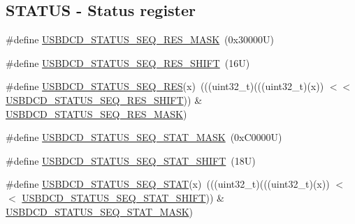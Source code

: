 \subsection*{S\+T\+A\+T\+US -\/ Status register}
\begin{DoxyCompactItemize}
\item 
\#define \mbox{\hyperlink{group___u_s_b_d_c_d___register___masks_gaa1c55980f5e31bfe02a2f4bc3bcf753d}{U\+S\+B\+D\+C\+D\+\_\+\+S\+T\+A\+T\+U\+S\+\_\+\+S\+E\+Q\+\_\+\+R\+E\+S\+\_\+\+M\+A\+SK}}~(0x30000\+U)
\item 
\#define \mbox{\hyperlink{group___u_s_b_d_c_d___register___masks_ga4d1d707ac9f9afb0b114a4032951971d}{U\+S\+B\+D\+C\+D\+\_\+\+S\+T\+A\+T\+U\+S\+\_\+\+S\+E\+Q\+\_\+\+R\+E\+S\+\_\+\+S\+H\+I\+FT}}~(16\+U)
\item 
\#define \mbox{\hyperlink{group___u_s_b_d_c_d___register___masks_gaeec86c1cd7a042be608295688f38d243}{U\+S\+B\+D\+C\+D\+\_\+\+S\+T\+A\+T\+U\+S\+\_\+\+S\+E\+Q\+\_\+\+R\+ES}}(x)~(((uint32\+\_\+t)(((uint32\+\_\+t)(x)) $<$$<$ \mbox{\hyperlink{group___u_s_b_d_c_d___register___masks_ga4d1d707ac9f9afb0b114a4032951971d}{U\+S\+B\+D\+C\+D\+\_\+\+S\+T\+A\+T\+U\+S\+\_\+\+S\+E\+Q\+\_\+\+R\+E\+S\+\_\+\+S\+H\+I\+FT}})) \& \mbox{\hyperlink{group___u_s_b_d_c_d___register___masks_gaa1c55980f5e31bfe02a2f4bc3bcf753d}{U\+S\+B\+D\+C\+D\+\_\+\+S\+T\+A\+T\+U\+S\+\_\+\+S\+E\+Q\+\_\+\+R\+E\+S\+\_\+\+M\+A\+SK}})
\item 
\#define \mbox{\hyperlink{group___u_s_b_d_c_d___register___masks_gad49d469540afee62a5a62a5419d89cf2}{U\+S\+B\+D\+C\+D\+\_\+\+S\+T\+A\+T\+U\+S\+\_\+\+S\+E\+Q\+\_\+\+S\+T\+A\+T\+\_\+\+M\+A\+SK}}~(0x\+C0000\+U)
\item 
\#define \mbox{\hyperlink{group___u_s_b_d_c_d___register___masks_ga8e3d04ac9b5b6195f765f29f82264376}{U\+S\+B\+D\+C\+D\+\_\+\+S\+T\+A\+T\+U\+S\+\_\+\+S\+E\+Q\+\_\+\+S\+T\+A\+T\+\_\+\+S\+H\+I\+FT}}~(18\+U)
\item 
\#define \mbox{\hyperlink{group___u_s_b_d_c_d___register___masks_gaa4db555b4aa4832902a32703f86116ea}{U\+S\+B\+D\+C\+D\+\_\+\+S\+T\+A\+T\+U\+S\+\_\+\+S\+E\+Q\+\_\+\+S\+T\+AT}}(x)~(((uint32\+\_\+t)(((uint32\+\_\+t)(x)) $<$$<$ \mbox{\hyperlink{group___u_s_b_d_c_d___register___masks_ga8e3d04ac9b5b6195f765f29f82264376}{U\+S\+B\+D\+C\+D\+\_\+\+S\+T\+A\+T\+U\+S\+\_\+\+S\+E\+Q\+\_\+\+S\+T\+A\+T\+\_\+\+S\+H\+I\+FT}})) \& \mbox{\hyperlink{group___u_s_b_d_c_d___register___masks_gad49d469540afee62a5a62a5419d89cf2}{U\+S\+B\+D\+C\+D\+\_\+\+S\+T\+A\+T\+U\+S\+\_\+\+S\+E\+Q\+\_\+\+S\+T\+A\+T\+\_\+\+M\+A\+SK}})
\item 

\end{DoxyCompactItemize}
